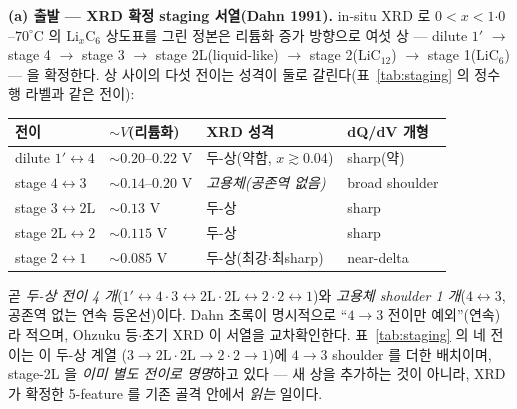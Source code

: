 \textbf{(a) 출발 --- XRD 확정 staging 서열(Dahn 1991).}
in-situ XRD 로 $0<x<1$$\cdot$$0$--$70^\circ$C 의 $\mathrm{Li}_x\mathrm{C_6}$ 상도표를 그린 정본은
리튬화 증가 방향으로 여섯 상 --- dilute $1'$ $\to$ stage 4 $\to$ stage 3 $\to$ stage 2L(liquid-like)
$\to$ stage 2($\mathrm{LiC_{12}}$) $\to$ stage 1($\mathrm{LiC_6}$) --- 을 확정한다\cite{dahn1991}. 상 사이의
다섯 전이는 성격이 둘로 갈린다(표~\ref{tab:staging} 의 정수 행 라벨과 같은 전이):
\begin{center}\footnotesize
\renewcommand{\arraystretch}{1.25}
\begin{tabular}{@{}llll@{}}
\hline
전이 & $\sim V$(리튬화) & XRD 성격 & dQ/dV 개형 \\
\hline
dilute $1'\!\leftrightarrow\!4$ & $\sim0.20$--$0.22$ V & 두-상(약함, $x\!\gtrsim\!0.04$) & sharp(약) \\
stage $4\!\leftrightarrow\!3$ & $\sim0.14$--$0.20$ V & \emph{고용체(공존역 없음)} & broad shoulder \\
stage $3\!\leftrightarrow\!2\mathrm L$ & $\sim0.13$ V & 두-상 & sharp \\
stage $2\mathrm L\!\leftrightarrow\!2$ & $\sim0.115$ V & 두-상 & sharp \\
stage $2\!\leftrightarrow\!1$ & $\sim0.085$ V & 두-상(최강$\cdot$최sharp) & near-delta \\
\hline
\end{tabular}
\end{center}
곧 \emph{두-상 전이 4 개}($1'\!\leftrightarrow\!4\cdot3\!\leftrightarrow\!2\mathrm L\cdot2\mathrm L\!\leftrightarrow\!2
\cdot2\!\leftrightarrow\!1$)와 \emph{고용체 shoulder 1 개}($4\!\leftrightarrow\!3$, 공존역 없는 연속 등온선)이다.
Dahn 초록이 명시적으로 ``$4\!\to\!3$ 전이만 예외''(연속)라 적으며, Ohzuku 등\cite{ohzuku1993}$\cdot$초기
XRD\cite{dahn1995} 이 서열을 교차확인한다. 표~\ref{tab:staging} 의 네 전이는 이 두-상 계열
($3\!\to\!2\mathrm L\cdot2\mathrm L\!\to\!2\cdot2\!\to\!1$)에 $4\!\to\!3$ shoulder 를 더한 배치이며, stage-2L 을
\emph{이미 별도 전이로 명명}하고 있다 --- 새 상을 추가하는 것이 아니라, XRD 가 확정한 5-feature 를 기존 골격
안에서 \emph{읽는} 일이다.

